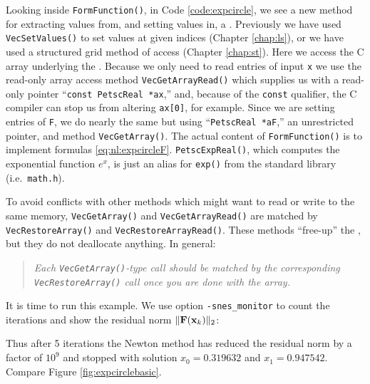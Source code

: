 Looking inside \texttt{FormFunction()}, in Code \ref{code:expcircle}, we see a new method for extracting values from, and setting values in, a \pVec.  Previously we have used \texttt{VecSetValues()} to set values at given indices (Chapter \ref{chap:ls}), or we have used a \pDMDA structured grid method of access (Chapter \ref{chap:st}).  Here we access the C array underlying the \pVec.  Because we only need to read entries of input \pVec \texttt{x} we use the read-only array access method \texttt{VecGetArrayRead()} which supplies us with a read-only pointer ``\texttt{const PetscReal *ax},'' and, because of the \texttt{const} qualifier, the C compiler can stop us from altering \texttt{ax[0]}, for example.  Since we are setting entries of \pVec \texttt{F}, we do nearly the same but using ``\texttt{PetscReal *aF},'' an unrestricted pointer, and method \texttt{VecGetArray()}.  The actual content of \texttt{FormFunction()} is to implement formulas \eqref{eq:nl:expcircleF}.  \texttt{PetscExpReal()}, which computes the exponential function $e^x$, is just an alias for \texttt{exp()} from the standard library (i.e.~\texttt{math.h}).

To avoid conflicts with other methods which might want to read or write to the same memory, \texttt{VecGetArray()} and \texttt{VecGetArrayRead()} are matched by \texttt{VecRestoreArray()} and \texttt{VecRestoreArrayRead()}.  These methods ``free-up''  the \pVecs, but they do not deallocate anything.  In general:
\begin{quote}
\emph{Each \emph{\texttt{VecGetArray()}}-type call should be matched by the corresponding \emph{\texttt{VecRestoreArray()}} call once you are done with the array.}
\end{quote}

It is time to run this example.  We use option \texttt{-snes\_monitor} to count the iterations and show the residual norm $\|\mathbf{F}(\mathbf{x}_k)\|_2$:
Thus after 5 iterations the Newton method has reduced the residual norm by a factor of $10^9$ and stopped with solution $x_0=0.319632$ and $x_1=0.947542$.  Compare Figure \ref{fig:expcirclebasic}.

